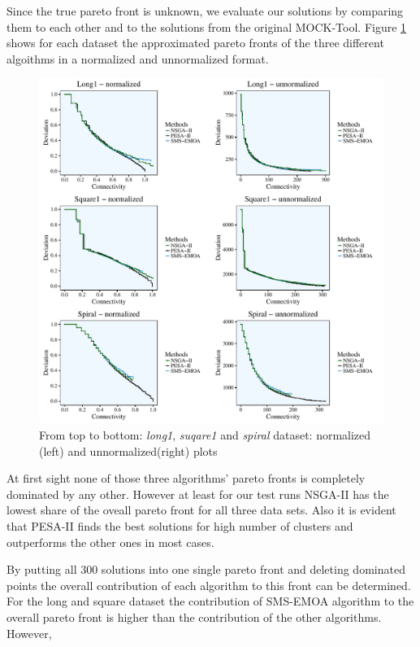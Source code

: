 \documentclass[parskip=half,DIV=14]{scrartcl}\usepackage[]{graphicx}\usepackage[]{color}
\begin{document}
Since the true pareto front is unknown, we evaluate our solutions by comparing them to each other and to the solutions from the original MOCK-Tool. Figure \ref{fig:comp} shows for each dataset the approximated pareto fronts of the three different algoithms in a normalized and unnormalized format.
\begin{figure}[!htb]
\begin{center}
\includegraphics[scale=0.70]{figure/Comparison.pdf}
\caption{From top to bottom: \emph{long1}, \emph{suqare1} and \emph{spiral} dataset: normalized (left) and unnormalized(right) plots}
\label{fig:comp}
\end{center}
\end{figure}


At first sight none of those three algorithms' pareto fronts is completely dominated by any other. However at least for our test runs NSGA-II has the lowest share of the oveall pareto front for all three data sets. Also it is evident that PESA-II finds the best solutions for high number of clusters and outperforms the other ones in most cases.

By putting all 300 solutions into one single pareto front and deleting dominated points the overall contribution of each algorithm to this front can be determined. For the long and square dataset the contribution of SMS-EMOA algorithm to the overall pareto front is higher than the contribution of the other algorithms. However, 
\end{document}
